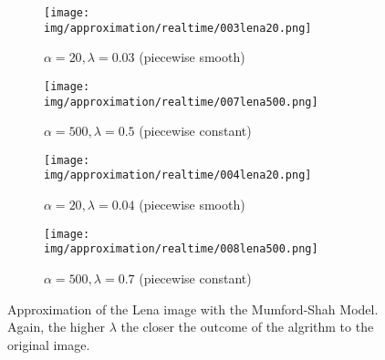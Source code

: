 \begin{figure}[ht]
    \centering
    \begin{subfigure}[b]{0.4\textwidth}
        \texttt{[image: img/approximation/realtime/003lena20.png]}
        \caption{$\alpha = 20, \lambda = 0.03$ (piecewise smooth)}
    \end{subfigure}
    \begin{subfigure}[b]{0.4\textwidth}
        \texttt{[image: img/approximation/realtime/007lena500.png]}
        \caption{$\alpha = 500, \lambda = 0.5$ (piecewise constant)}
    \end{subfigure}
    \begin{subfigure}[b]{0.4\textwidth}
        \texttt{[image: img/approximation/realtime/004lena20.png]}
        \caption{$\alpha = 20, \lambda = 0.04$ (piecewise smooth)}
    \end{subfigure}
    \begin{subfigure}[b]{0.4\textwidth}
        \texttt{[image: img/approximation/realtime/008lena500.png]}
        \caption{$\alpha = 500, \lambda = 0.7$ (piecewise constant)}
    \end{subfigure}
    \caption{Approximation of the Lena image with the Mumford-Shah Model. Again, the higher $\lambda$ the closer the outcome of the algrithm to the original image.}
\label{fig:realtime_lena_compare}
\end{figure}

